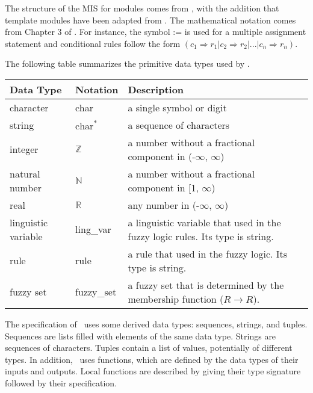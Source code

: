 \documentclass[12pt, titlepage]{article}
\begin{document}

The structure of the MIS for modules comes from \citet{HoffmanAndStrooper1995},
with the addition that template modules have been adapted from
\cite{GhezziEtAl2003}.  The mathematical notation comes from Chapter 3 of
\citet{HoffmanAndStrooper1995}.  For instance, the symbol := is used for a
multiple assignment statement and conditional rules follow the form $(c_1
\Rightarrow r_1 | c_2 \Rightarrow r_2 | ... | c_n \Rightarrow r_n )$.

The following table summarizes the primitive data types used by \progname. 

\begin{center}
\renewcommand{\arraystretch}{1.2}
\noindent 
\begin{tabular}{l l p{7.5cm}} 
\toprule 
\textbf{Data Type} & \textbf{Notation} & \textbf{Description}\\ 
\midrule
character & char & a single symbol or digit\\
string & $\text{char}^*$ & a sequence of characters\\
integer & $\mathbb{Z}$ & a number without a fractional component in (-$\infty$, $\infty$) \\
natural number & $\mathbb{N}$ & a number without a fractional component in [1, $\infty$) \\
real & $\mathbb{R}$ & any number in (-$\infty$, $\infty$)\\
linguistic variable & ling\_var & a linguistic variable that used in the fuzzy logic rules. 
                               Its type is string.\\
rule & rule & a rule that used in the fuzzy logic. Its type is string.\\
fuzzy set & fuzzy\_set & a fuzzy set that is determined by the membership function ($R \rightarrow R$).\\
\bottomrule
\end{tabular} 
\end{center}

\noindent
The specification of \progname \ uses some derived data types: sequences, strings, and
tuples. Sequences are lists filled with elements of the same data type. Strings
are sequences of characters. Tuples contain a list of values, potentially of
different types. In addition, \progname \ uses functions, which
are defined by the data types of their inputs and outputs. Local functions are
described by giving their type signature followed by their specification.
\end{document}
